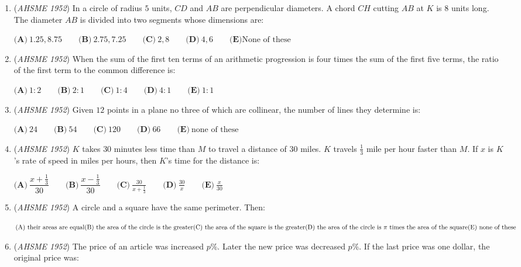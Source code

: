 \begin{enumerate}
	\item (\textit{AHSME 1952}) In a circle of radius $5$ units, $CD$ and $AB$ are perpendicular diameters. A chord $CH$ cutting $AB$ at $K$ is $8$ units long.  The diameter $AB$ is divided into two segments whose dimensions are:


 $\textbf{(A)}\ 1.25, 8.75  \qquad \textbf{(B)}\ 2.75, 7.25\qquad \textbf{(C)}\ 2,8 \qquad \textbf{(D)} \ 4,6 \qquad \textbf{(E)} \text{None of these}$


	\item (\textit{AHSME 1952}) When the sum of the first ten terms of an arithmetic progression is four times the sum of the first five terms, the ratio of the first term to the common difference is: 


 $\textbf{(A)}\ 1: 2 \qquad \textbf{(B)}\ 2: 1 \qquad \textbf{(C)}\ 1: 4 \qquad \textbf{(D)}\ 4: 1 \qquad \textbf{(E)}\ 1: 1$


	\item (\textit{AHSME 1952}) Given $12$ points in a plane no three of which are collinear, the number of lines they determine is: 


 $\textbf{(A)}\ 24 \qquad \textbf{(B)}\ 54 \qquad \textbf{(C)}\ 120 \qquad \textbf{(D)}\ 66 \qquad \textbf{(E)}\ \text{none of these}$


	\item (\textit{AHSME 1952}) $K$ takes $30$ minutes less time than $M$ to travel a distance of $30$ miles. $K$ travels $\frac {1}{3}$ mile per hour faster than $M$. If $x$ is $K$'s rate of speed in miles per hours, then $K$'s time for the distance is: 


 $\textbf{(A)}\ \dfrac{x + \frac {1}{3}}{30} \qquad \textbf{(B)}\ \dfrac{x - \frac {1}{3}}{30} \qquad \textbf{(C)}\ \frac{30}{x+\frac{1}{3}}\qquad \textbf{(D)}\ \frac{30}{x}\qquad \textbf{(E)}\ \frac{x}{30}$


	\item (\textit{AHSME 1952}) A circle and a square have the same perimeter. Then: 


 $\text{(A) their areas are equal}\qquad\\ \text{(B) the area of the circle is the greater} \qquad\\ \text{(C) the area of the square is the greater} \qquad\\ \text{(D) the area of the circle is } \pi \text{ times the area of the square}\qquad\\ \text{(E) none of these}$


	\item (\textit{AHSME 1952}) The price of an article was increased $p\%$. Later the new price was decreased $p\%$. If the last price was one dollar, the original price was: 



\end{enumerate}
